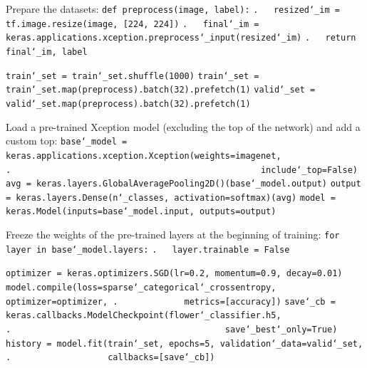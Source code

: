 Prepare the datasets:\newline
\texttt{def preprocess(image, label):}\newline
\texttt{.~~~resized\char`_im = tf.image.resize(image, [224, 224])}\newline
\texttt{.~~~final\char`_im = keras.applications.xception.preprocess\char`_input(resized\char`_im)}\newline
\texttt{.~~~return final\char`_im, label}

\texttt{train\char`_set = train\char`_set.shuffle(1000)}\newline
\texttt{train\char`_set = train\char`_set.map(preprocess).batch(32).prefetch(1)}\newline
\texttt{valid\char`_set = valid\char`_set.map(preprocess).batch(32).prefetch(1)}

Load a pre-trained Xception model (excluding the top of the network) and add a custom top:\newline
\texttt{base\char`_model = keras.applications.xception.Xception(weights=\textquotesingle imagenet\textquotesingle,\newline
.~~~~~~~~~~~~~~~~~~~~~~~~~~~~~~~~~~~~~~~~~~~~~~~~~include\char`_top=False)}\newline
\texttt{avg = keras.layers.GlobalAveragePooling2D()(base\char`_model.output)}\newline
\texttt{output = keras.layers.Dense(n\char`_classes, activation=\textquotesingle softmax\textquotesingle)(avg)}\newline
\texttt{model = keras.Model(inputs=base\char`_model.input, outputs=output)}

Freeze the weights of the pre-trained layers at the beginning of training:\newline
\texttt{for layer in base\char`_model.layers:}\newline
\texttt{.~~~layer.trainable = False}

\texttt{optimizer = keras.optimizers.SGD(lr=0.2, momentum=0.9, decay=0.01)}\newline
\texttt{model.compile(loss=\textquotesingle sparse\char`_categorical\char`_crossentropy\textquotesingle, optimizer=optimizer,\newline
.~~~~~~~~~~~~~metrics=[\textquotesingle accuracy\textquotesingle])}\newline
\texttt{save\char`_cb = keras.callbacks.ModelCheckpoint(\textquotesingle flower\char`_classifier.h5\textquotesingle,}\newline
\texttt{.~~~~~~~~~~~~~~~~~~~~~~~~~~~~~~~~~~~~~~~~~~save\char`_best\char`_only=True)}\newline
\texttt{history = model.fit(train\char`_set, epochs=5, validation\char`_data=valid\char`_set,}\newline
\texttt{.~~~~~~~~~~~~~~~~~~~callbacks=[save\char`_cb])}

